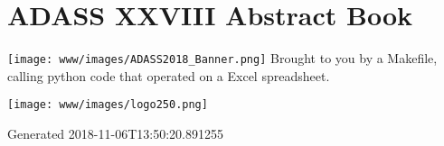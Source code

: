 \documentclass{report}
\begin{document}
              \chapter*{ADASS XXVIII Abstract Book}              
              \texttt{[image: www/images/ADASS2018\_Banner.png]}
              Brought to you by a Makefile, calling python code that operated on a Excel spreadsheet.
              \newline\newline
              \bigskip\bigskip
              \begin{center}
              \texttt{[image: www/images/logo250.png]}
              \end{center}
              \bigskip
           Generated 2018-11-06T13:50:20.891255\newpage
\end{document}
